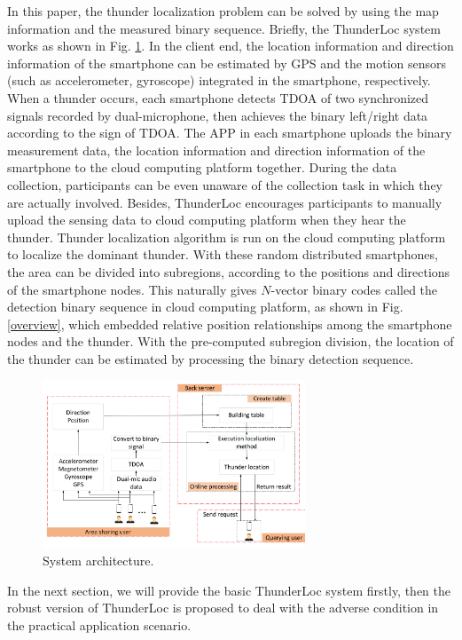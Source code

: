  In this paper, the thunder localization problem can be solved by using the map information and the measured binary sequence.
 Briefly, the ThunderLoc system works as shown in Fig. \ref{architecture}. 
 In the client end, the location information and direction information of the smartphone can be estimated by GPS and the motion sensors (such as accelerometer, gyroscope) integrated in the smartphone, respectively.
 When a thunder occurs, each smartphone detects TDOA of two synchronized signals recorded by dual-microphone, then achieves the binary left/right data according to the sign of TDOA.
 The APP in each smartphone uploads the binary measurement data, the location information and direction information of the smartphone to the cloud computing platform together.
 During the data collection, participants can be even unaware of the collection task in which they are actually involved.
 Besides, ThunderLoc encourages participants to manually upload the sensing data to cloud computing platform when they hear the thunder.
 Thunder localization algorithm is run on the cloud computing platform to localize the dominant thunder.
With these random distributed smartphones, the area can be divided into subregions, according to the positions and directions of the smartphone nodes.
This naturally gives $N$-vector binary codes called the detection binary sequence in cloud computing platform,
as shown in Fig. \ref{overview}, which embedded relative position relationships among the smartphone nodes and the thunder. 
With the pre-computed subregion division, the location of the thunder can be estimated by processing the binary detection sequence.
   \vspace{-4mm}
  \begin{figure}[htb]
            \setlength{\abovecaptionskip}{0pt}
            \centering
            \includegraphics[scale=2,height=5.0cm]{fig/architecture.pdf}
			 \vspace{1mm}
            \caption{\label{architecture}System architecture.}
            \vspace{-4mm}
  \end{figure}
  
In the next section, we will provide the basic ThunderLoc system firstly, 
then the robust version of ThunderLoc is proposed to deal with the adverse condition in the practical application scenario.
  




